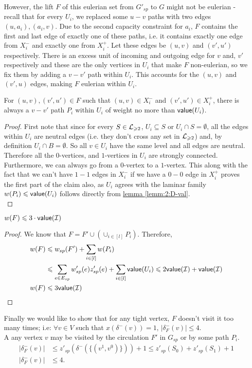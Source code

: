 \documentclass[./main.tex]{subfiles}
\begin{document}
		However, the lift $F$ of this eulerian set from $G'_{sp}$ to $G$ might not be eulerian - recall that for every $U_i$, we replaced some $u-v$ paths with two edges $(u,a_i),(a_i,v)$.
		Due to the second capacity constraint for $a_i$, $F$ contains the first and last edge of exactly one of these paths, i.e. it contains exactly one edge from $X_i^-$ and exactly one from $X_i^+$.
		Let these edges be $(u,v)$ and $(v',u')$ respectively. There is an excess unit of incoming and outgoing edge for $v$ and, $v'$ respectively and these are the only vertices in $U_i$ that make $F$ non-eulerian, so we fix them by adding a $v-v'$ path within $U_i$. This accounts for the $(u,v)$ and $(v',u
		)$ edges, making $F$ eulerian within $U_i$.\vspace{1mm}
		\begin{claim}
			For $(u,v),(v',u')\in F$ such that $(u,v)\in X^-_i$ and $(v',u')\in X^+_i$, there is always a $v-v'$ path $P_i$ within $U_i$ of weight no more than $\textsf{\textup{value}}(U_i)$.\label{claim:7:uvpath}
		\end{claim}
		\begin{proof}
			First note that since for every $S\in \mathcal{L}_{\geqslant 2}$, $U_i\subseteq S$ or $U_i\cap S = \emptyset$, all the edges within $U_i$ are neutral edges (i.e. they don't cross any set in $\mathcal{L}_{\geqslant 2}$) and, by definition $U_i \cap B = \emptyset$.
			So all $v \in U_i$ have the same level and all edges are neutral.
			Therefore all the $0$-vertices, and $1$-vertices in $U_i$ are strongly connected. Furthermore, we can always go from a $0$-vertex to a $1$-vertex. This along with the fact that we can't have $1-1$ edges in $X_i^-$ if we have a $0-0$ edge in $X_i^+$ proves the first part of the claim also, as $U_i$ agrees with the laminar family $w(P_i) \leqslant \textsf{\textup{value}}(U_i)$ follows directly from \hyperref[lemm:2:D-val]{lemma \ref{lemm:2:D-val}}.\\
		\end{proof}

		\begin{claim}
			$w(F) \leqslant 3\cdot\textsf{\textup{value}}(\mathcal{I})$
		\end{claim}
		\begin{proof}
			We know that $F = F' \cup (\cup_{i \in [l]} P_i)$. Therefore,
			\begin{align*}
				w(F) &\leqslant w_{sp}(F') + \sum_{i \in [l]} w(P_i)\\
				&\leqslant \sum_{e \in E_{sp}} w'_{sp}(e)z'_{sp}(e) + \sum_{i \in [l]} \textsf{\textup{value}}(U_i) \leqslant 2\textsf{\textup{value}}(\mathcal{I}) + \textsf{\textup{value}}(\mathcal{I})\\
				w(F) &\leqslant 3\textsf{\textup{value}}(\mathcal{I})
			\end{align*}
		\end{proof}
		Finally we would like to show that for any tight vertex, $F$ doesn't visit it too many times; i.e: $\forall v \in V$ such that $x(\delta^-(v)) = 1$, $|\delta^-_F(v)| \leqslant 4$.\\
		A any vertex $v$ may be visited by the circulation $F'$ in $G_{sp}$ or by some path $P_i$.
		\begin{align*}
			|\delta^-_F(v)| &\leqslant z'_{sp}(\delta^-(\{(v^1, v^0)\})) + 1 \leqslant z'_{sp}(S_0) + z'_{sp}(S_1) + 1\\
			|\delta^-_F(v)| &\leqslant 4.
		\end{align*}
\end{document}
